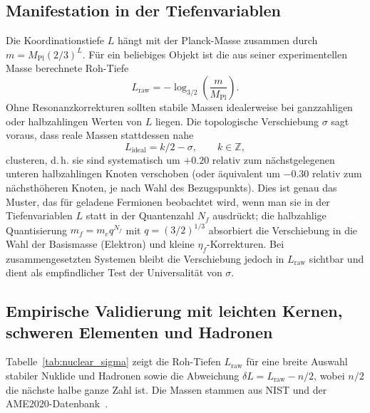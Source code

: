 \documentclass[12pt,a4paper]{article}
\begin{document}
	\subsection{Manifestation in der Tiefenvariablen}
	
	Die Koordinationstiefe \(L\) hängt mit der Planck-Masse zusammen durch \(m = M_{\mathrm{Pl}}(2/3)^L\). Für ein beliebiges Objekt ist die aus seiner experimentellen Masse berechnete Roh-Tiefe
	\begin{equation}
		L_{\mathrm{raw}} = -\log_{3/2}\!\left(\frac{m}{M_{\mathrm{Pl}}}\right).
	\end{equation}
	Ohne Resonanzkorrekturen sollten stabile Massen idealerweise bei ganzzahligen oder halbzahlingen Werten von \(L\) liegen. Die topologische Verschiebung \(\sigma\) sagt voraus, dass reale Massen stattdessen nahe
	\[
	L_{\mathrm{ideal}} = k/2 - \sigma, \qquad k\in\mathbb{Z},
	\]
	clusteren, d. h. sie sind systematisch um \(+0.20\) relativ zum nächstgelegenen unteren halbzahlingen Knoten verschoben (oder äquivalent um \(-0.30\) relativ zum nächsthöheren Knoten, je nach Wahl des Bezugspunkts). Dies ist genau das Muster, das für geladene Fermionen beobachtet wird, wenn man sie in der Tiefenvariablen \(L\) statt in der Quantenzahl \(N_f\) ausdrückt; die halbzahlige Quantisierung \(m_f = m_e q^{N_f}\) mit \(q=(3/2)^{1/3}\) absorbiert die Verschiebung in die Wahl der Basismasse (Elektron) und kleine \(\eta_f\)-Korrekturen. Bei zusammengesetzten Systemen bleibt die Verschiebung jedoch in \(L_{\mathrm{raw}}\) sichtbar und dient als empfindlicher Test der Universalität von \(\sigma\).
	
	\subsection{Empirische Validierung mit leichten Kernen, schweren Elementen und Hadronen}
	
	Tabelle~\ref{tab:nuclear_sigma} zeigt die Roh-Tiefen \(L_{\mathrm{raw}}\) für eine breite Auswahl stabiler Nuklide und Hadronen sowie die Abweichung \(\delta L = L_{\mathrm{raw}} - n/2\), wobei \(n/2\) die nächste halbe ganze Zahl ist. Die Massen stammen aus NIST und der AME2020-Datenbank~\cite{AME2020}.
	
\end{document}
